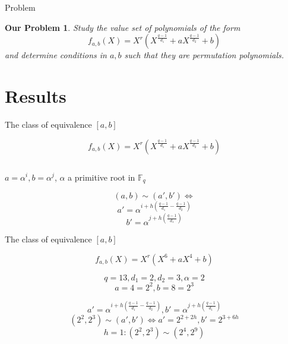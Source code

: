 \documentclass{beamer}
\newtheorem{ourproblem}{Our Problem}
\begin{document}
\begin{frame}{Problem}
  \begin{ourproblem}
    Study the value set of polynomials of the form $$f_{a,b}(X) = X^r(X^{\frac{q-1}{d_1}} + aX^{\frac{q-1}{d_2}} +b)$$ and determine conditions in $a,b$ such that they are permutation polynomials.
  \end{ourproblem}
\end{frame}

\section{Results} %
\label{sec:results}


\begin{frame}{The class of equivalence $[a,b]$}
  
  {\Large $$f_{a,b}(X) = X^r(X^{\frac{q-1}{d_1}} + aX^{\frac{q-1}{d_2}} +b)$$}

  $$$$

  {\Large $a = \alpha^i, b = \alpha^j$, $\alpha$ a primitive root in $\mathbb{F}_q$
    }  \pause
  $$$$

  {\Large $$(a,b) \sim (a', b')
    \Longleftrightarrow$$ }
  \pause
  \linebreak
  {\Large $$a' = \alpha^{i+h(\frac{q-1}{d_1} - \frac{q-1}{d_2})}$$}
  \pause
  $$$$ 
  {\Large $$b' = \alpha^{j+h(\frac{q-1}{d_1})}$$}

\end{frame}

\begin{frame}{The class of equivalence $[a,b]$}


  {\Large $$f_{a,b}(X) = X^r(X^{6} + aX^{4} +b)$$
  \vspace{0.3cm}

  $$q = 13 , d_1 = 2 , d_2 = 3 , \alpha = 2$$
  \pause
  \vspace{0.3cm}  
  $$a = 4 = 2^2 , b = 8 = 2^3$$

  $$a' = \alpha^{i+h(\frac{q-1}{d_1} - \frac{q-1}{d_2})}, b' = \alpha^{j+h(\frac{q-1}{d_1})}$$
  \pause
  $$(2^2,2^3) \sim (a',b') \Longleftrightarrow a' = 2^{2+2h}, b' = 2^{3+6h}$$
  \linebreak \pause
  $$ h=1{: } (2^2,2^3) \sim (2^4,2^9)$$}

\end{frame}
\end{document}
